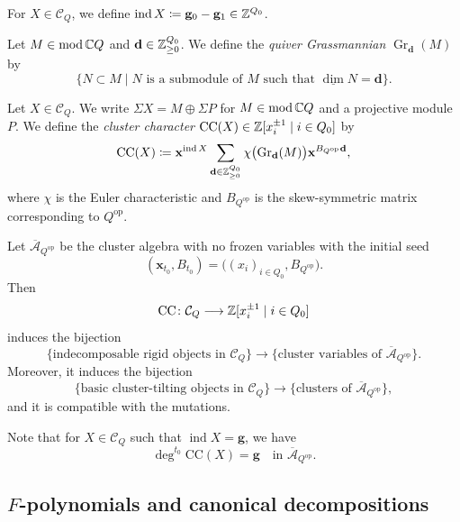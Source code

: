 For $X \in \mathcal{C}_Q$, we define
$\operatorname{ind}X \coloneq
\mathbf{g}_0 - \mathbf{g}_1 \in \mathbb{Z}^{Q_0}$.

\begin{Def}[{\cite[\S2.2]{CK06}}]
\label{Def : quiver Grassmannians}
Let $M \in \operatorname{mod}\mathbb{C} Q$
and $\mathbf{d} \in \mathbb{Z}_{\geq 0}^{Q_0}$.
We define the \emph{quiver Grassmannian}
$\operatorname{Gr}_{\mathbf{d}}(M)$ by
\[
\{N \subset M \mid N \text{ is a submodule of } M
\text{ such that } \underline{\dim}N = \mathbf{d}\}.
\]
\end{Def}

\begin{Def}[{\cite{CK06}}]
\label{Def : cluster character}
Let $X \in \mathcal{C}_Q$.
We write $\Sigma X = M \oplus \Sigma P$
for $M \in \operatorname{mod}\mathbb{C} Q$ and a projective module $P$.
We define the \emph{cluster character}
$\mathrm{CC}(X) \in \mathbb{Z}[x_i^{\pm 1} \mid i \in Q_0]$ by
\[
\mathrm{CC}(X) \coloneq
\mathbf{x}^{\operatorname{ind}X}
\sum_{\mathbf{d} \in \mathbb{Z}_{\geq 0}^{Q_0}}
\chi\bigl(\operatorname{Gr}_{\mathbf{d}}(M)\bigr)
\mathbf{x}^{B_{Q^{\mathrm{op}}}\mathbf{d}},
\]
where $\chi$ is the Euler characteristic and $B_{Q^{\mathrm{op}}}$ is
the skew-symmetric matrix corresponding to $Q^{\mathrm{op}}$.
\end{Def}

\begin{Thm}[{\cite[Theorem 4]{CK06}}]
\label{Thm : cluster tilting objects and clusters}
Let $\overline{\mathcal{A}}_{Q^{\mathrm{op}}}$ be the cluster algebra with no frozen variables 
with the initial seed
\[
(\mathbf{x}_{t_0}, B_{t_0})
= \bigl((x_i)_{i \in Q_0}, B_{Q^{\mathrm{op}}}\bigr).
\]
Then
\[
\mathrm{CC} \colon \mathcal{C}_Q \longrightarrow
\mathbb{Z}[x_i^{\pm 1} \mid i \in Q_0]
\]
induces the bijection
\[
\{\text{indecomposable rigid objects in } \mathcal{C}_Q\}
\longrightarrow
\{\text{cluster variables of }
\overline{\mathcal{A}}_{Q^{\mathrm{op}}}\}.
\]
Moreover, it induces the bijection
\[
\{\text{basic cluster-tilting objects in } \mathcal{C}_Q\}
\longrightarrow
\{\text{clusters of }\overline{\mathcal{A}}_{Q^{\mathrm{op}}}\},
\]
and it is compatible with the mutations.
\end{Thm}

Note that for $X \in \mathcal{C}_Q$ such that
$\operatorname{ind}X = \mathbf{g}$, we have
\[
\deg^{t_0}\mathrm{CC}(X) = \mathbf{g}
\quad\text{in }\overline{\mathcal{A}}_{Q^{\mathrm{op}}}.
\]


\subsection{$F$-polynomials and canonical decompositions}
\label{ssec : F polynomials and canonical decompositions}

